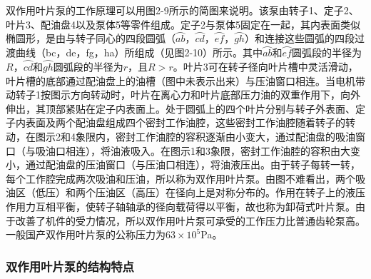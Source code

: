 双作用叶片泵的工作原理可以用图2-9所示的简图来说明。该泵由转子1、定子2、叶片3、配油盘4以及泵体5等零件组成。定子2与泵体5固定在一起，其内表面类似椭圆形，是由与转子同心的四段圆弧（$\wideparen{ab}$，$\wideparen{cd}$，$\wideparen{ef}$，$\wideparen{gh}$）和连接这些圆弧的四段过渡曲线（bc，de，fg，ha）所组成（见图2-10）所示。其中$\wideparen{ab}$和$\wideparen{ef}$圆弧段的半径为$R$，$\wideparen{cd}$和$\wideparen{gh}$圆弧段的半径为$r$，且$R>r$。叶片3可在转子径向叶片槽中灵活滑动，叶片槽的底部通过配油盘上的油槽（图中未表示出来）与压油窗口相连。当电机带动转子1按图示方向转动时，叶片在离心力和叶片底部压力油的双重作用下，向外伸出，其顶部紧贴在定子内表面上。处于圆弧上的四个叶片分别与转子外表面、定子内表面及两个配油盘组成四个密封工作油腔，这些密封工作油腔随着转子的转动，在图示2和4象限内，密封工作油腔的容积逐渐由小变大，通过配油盘的吸油窗口（与吸油口相连），将油液吸入。在图示1和3象限，密封工作油腔的容积由大变小，通过配油盘的压油窗口（与压油口相连），将油液压出。由于转子每转一转，每个工作腔完成两次吸油和压油，所以称为双作用叶片泵。由图不难看出，两个吸油区（低压）和两个压油区（高压）在径向上是对称分布的。作用在转子上的液压作用力互相平衡，使转子轴轴承的径向载荷得以平衡，故也称为卸荷式叶片泵。由于改善了机件的受力情况，所以双作用叶片泵可承受的工作压力比普通齿轮泵高。一般国产双作用叶片泵的公称压力为$63\times10^5$Pa。

\subsubsection{双作用叶片泵的结构特点}


